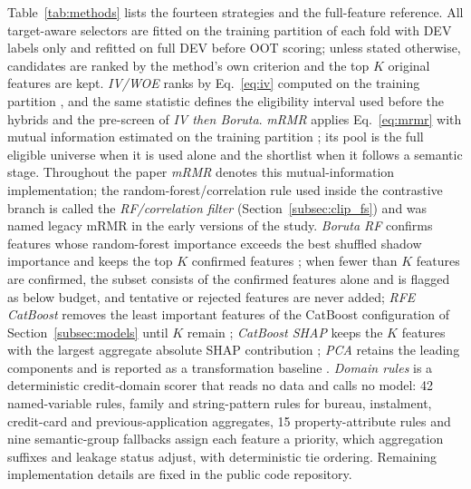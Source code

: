 \documentclass[final,5p,twocolumn]{elsarticle}
\newcommand{\Kfeat}{K}
\begin{document}
Table~\ref{tab:methods} lists the fourteen strategies and the full-feature reference. All target-aware selectors are fitted on the training partition of each fold with DEV labels only and refitted on full DEV before OOT scoring; unless stated otherwise, candidates are ranked by the method's own criterion and the top $\Kfeat$ original features are kept. \emph{IV/WOE} ranks by Eq.~\eqref{eq:iv} computed on the training partition \cite{siddiqi2006}, and the same statistic defines the eligibility interval used before the hybrids and the pre-screen of \emph{IV then Boruta}. \emph{mRMR} applies Eq.~\eqref{eq:mrmr} with mutual information estimated on the training partition \cite{peng2005,kraskov2004,ross2014}; its pool is the full eligible universe when it is used alone and the shortlist when it follows a semantic stage. Throughout the paper \emph{mRMR} denotes this mutual-information implementation; the random-forest/correlation rule used inside the contrastive branch is called the \emph{RF/correlation filter} (Section~\ref{subsec:clip_fs}) and was named legacy mRMR in the early versions of the study. \emph{Boruta RF} confirms features whose random-forest importance exceeds the best shuffled shadow importance and keeps the top $\Kfeat$ confirmed features \cite{kursa2010,breiman2001}; when fewer than $\Kfeat$ features are confirmed, the subset consists of the confirmed features alone and is flagged as below budget, and tentative or rejected features are never added; \emph{RFE CatBoost} removes the least important features of the CatBoost configuration of Section~\ref{subsec:models} until $\Kfeat$ remain \cite{guyon2002}; \emph{CatBoost SHAP} keeps the $\Kfeat$ features with the largest aggregate absolute SHAP contribution \cite{lundberg2017}; \emph{PCA} retains the leading components and is reported as a transformation baseline \cite{jolliffe2016}. \emph{Domain rules} is a deterministic credit-domain scorer that reads no data and calls no model: 42 named-variable rules, family and string-pattern rules for bureau, instalment, credit-card and previous-application aggregates, 15 property-attribute rules and nine semantic-group fallbacks assign each feature a priority, which aggregation suffixes and leakage status adjust, with deterministic tie ordering. Remaining implementation details are fixed in the public code repository.
\end{document}
